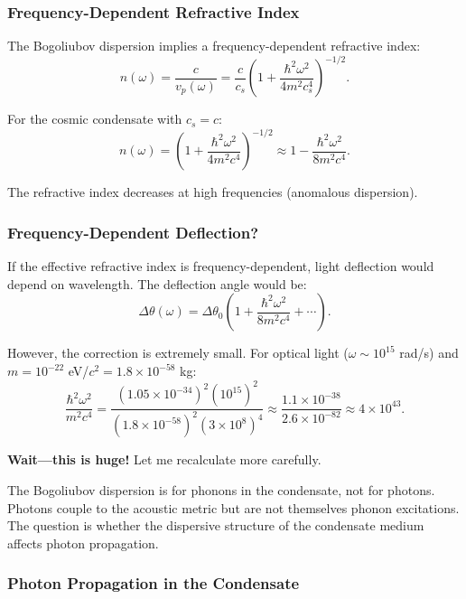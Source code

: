 \documentclass[11pt,a4paper]{article}
\newcommand{\ee}[1]{\times 10^{#1}}
\theoremstyle{definition}
\theoremstyle{remark}
\begin{document}
\subsubsection{Frequency-Dependent Refractive Index}

The Bogoliubov dispersion implies a frequency-dependent refractive index:
\begin{equation}
n(\omega) = \frac{c}{v_p(\omega)} = \frac{c}{c_s}\left(1 + \frac{\hbar^2 \omega^2}{4m^2 c_s^4}\right)^{-1/2}.
\end{equation}

For the cosmic condensate with $c_s = c$:
\begin{equation}
n(\omega) = \left(1 + \frac{\hbar^2 \omega^2}{4m^2 c^4}\right)^{-1/2} \approx 1 - \frac{\hbar^2 \omega^2}{8m^2 c^4}.
\end{equation}

The refractive index decreases at high frequencies (anomalous dispersion).

\subsubsection{Frequency-Dependent Deflection?}

If the effective refractive index is frequency-dependent, light deflection would depend on wavelength. The deflection angle would be:
\begin{equation}
\Delta\theta(\omega) = \Delta\theta_0 \left(1 + \frac{\hbar^2 \omega^2}{8m^2 c^4} + \cdots\right).
\end{equation}

However, the correction is extremely small. For optical light ($\omega \sim 10^{15}$ rad/s) and $m = 10^{-22}$ eV/$c^2 = 1.8 \ee{-58}$ kg:
\begin{equation}
\frac{\hbar^2 \omega^2}{m^2 c^4} = \frac{(1.05 \ee{-34})^2 (10^{15})^2}{(1.8 \ee{-58})^2 (3 \ee{8})^4} \approx \frac{1.1 \ee{-38}}{2.6 \ee{-82}} \approx 4 \ee{43}.
\end{equation}

\textbf{Wait---this is huge!} Let me recalculate more carefully.

The Bogoliubov dispersion is for phonons in the condensate, not for photons. Photons couple to the acoustic metric but are not themselves phonon excitations. The question is whether the dispersive structure of the condensate medium affects photon propagation.

\subsubsection{Photon Propagation in the Condensate}
\end{document}
